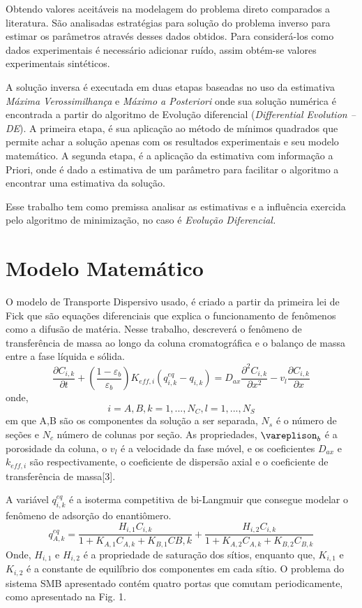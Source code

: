 \documentclass[por]{Template_SBEF}
\begin{document}
Obtendo valores aceitáveis na modelagem do problema direto comparados a literatura. São analisadas estratégias para solução do problema inverso para estimar os parâmetros através desses dados obtidos. Para considerá-los como dados experimentais é necessário adicionar ruído, assim obtém-se valores experimentais sintéticos.

A solução inversa é executada em duas etapas baseadas no uso da estimativa \textit{Máxima Verossimilhança} e \textit{Máximo a Posteriori} onde sua solução numérica é encontrada a partir do algoritmo de Evolução diferencial (\textit{Differential Evolution – DE}). A primeira etapa, é sua aplicação ao método de mínimos quadrados que permite achar a solução apenas com os resultados experimentais e seu modelo matemático. A segunda etapa, é a aplicação da estimativa com informação a Priori, onde é dado a estimativa de um parâmetro para facilitar o algoritmo a encontrar uma estimativa da solução.

Esse trabalho tem como premissa analisar as estimativas e a influência exercida pelo algoritmo de minimização, no caso é \textit{Evolução Diferencial.}


\section{Modelo Matemático}
   O modelo de Transporte Dispersivo usado, é criado a partir da primeira lei de Fick que são equações diferenciais que explica o funcionamento de fenômenos como a difusão de matéria. Nesse trabalho, descreverá o fenômeno de transferência de massa ao longo da coluna cromatográfica e o balanço de massa entre a fase líquida e sólida.
\begin{equation}
\frac{\partial C_{i,k}}{\partial t} + (\frac{1-\varepsilon_b}{\varepsilon_b}
) K_{eff,i} (q_{i,k}^{eq} - q_{i,k}) = D_{ax} \frac{\partial^2 C_{i,k}}{\partial x^2} 
- v_l \frac{\partial C_{i,k}}{\partial x}
\end{equation}
onde, 
\begin{equation}
i = A,B, k = 1,...,N_C, l = 1,...,N_S 
\end{equation}
em que A,B são os componentes da solução a ser separada, $N_s$ é o número de seções e $N_c$ número de colunas por seção. As propriedades, $\vareplison_b$ é a porosidade da coluna, o $v_l$ é a velocidade da fase móvel, e os coeficientes $D_{ax}$ e $k_{eff,i}$  são respectivamente, o coeficiente de dispersão axial e o coeficiente de transferência de massa[3].

A variável  $q_{i,k}^{eq}$  é a isoterma competitiva de bi-Langmuir que consegue modelar o fenômeno de adsorção do enantiômero.
\begin{equation}
q_{A,k}^{eq} = \frac{H_{i,1} C_{i,k}}{1+K_{A,1} C_{A,k} + K_{B,1} C{B,k}}+\frac{H_{i,2} C_{i,k}}{1+K_{A,2} C_{A,k} + K_{B,2} C_{B,k}}
\end{equation}
Onde, $H_{i,1}$ e $H_{i,2}$ é a propriedade de saturação dos sítios, enquanto que, $K_{i,1}$ e $K_{i,2}$ é a constante de equilíbrio dos componentes em cada sítio.
O problema do sistema SMB apresentado contém quatro portas que comutam periodicamente, como apresentado na Fig. 1.
\end{document}
